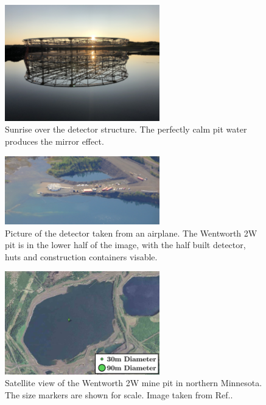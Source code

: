 \begin{figure} %
    \includegraphics[width=0.6\textwidth]{diagrams/4-chips/sunrise.jpeg}
    \caption[Sunrise over the \chips detector.]
    {Sunrise over the \chips detector structure. The perfectly calm pit water
        produces the mirror effect.}
    \label{fig:sunrise}
\end{figure}

\begin{figure} %
    \includegraphics[width=0.6\textwidth]{diagrams/4-chips/from_the_sky.jpg}
    \caption[Picture of the \chips detector from the air.]
    {Picture of the \chips detector taken from an airplane. The Wentworth 2W pit is in the lower
        half of the image, with the half built detector, huts and construction containers
        visable.}
    \label{fig:from_the_sky}
\end{figure}

\begin{figure} %
    \includegraphics[width=0.6\textwidth]{diagrams/4-chips/location.png}
    \caption[Satellite view of the Wentworth 2W mine pit.]
    {Satellite view of the Wentworth 2W mine pit in northern Minnesota.
        The size markers are shown for scale. Image taken from Ref.\cite{adamson2013}.}
    \label{fig:location}
\end{figure}

